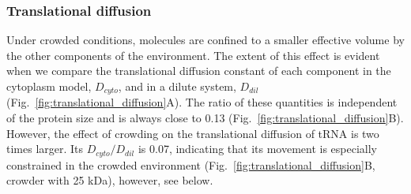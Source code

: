 \documentclass[journal=jcisd8,manuscript=article]{achemso}
\begin{document}
\subsubsection{Translational diffusion}

Under crowded conditions, molecules are confined to a smaller
effective volume by the other components of the environment.  The
extent of this effect is evident when we compare the translational
diffusion constant of each component in the cytoplasm model,
$D_{cyto}$, and in a dilute system, $D_{dil}$
(Fig.~\ref{fig:translational_diffusion}A). The ratio of these
quantities is independent of the protein size and is always close to
0.13 (Fig.~\ref{fig:translational_diffusion}B). However, the effect of
crowding on the translational diffusion of tRNA is two times
larger. Its $D_{cyto}/D_{dil}$ is 0.07, indicating that its movement
is especially constrained in the crowded environment
(Fig.~\ref{fig:translational_diffusion}B, crowder with 25 kDa),
however, see below.
\end{document}
